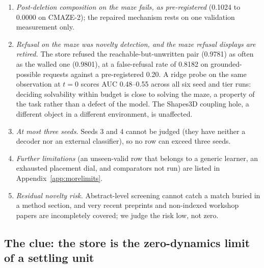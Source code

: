 \documentclass{article} %
\begin{document}
\begin{enumerate}[leftmargin=*,itemsep=1pt]
  the store, the pre-declared falsifier fired on row 3 (\S\ref{sec:bard}). %
\item \emph{Post-deletion composition on the maze fails, as pre-registered} (0.1024 to 0.0000
  on CMAZE-2); the repaired mechanism rests on one validation measurement only.
\item \emph{Refusal on the maze was novelty detection, and the maze refusal displays are
  retired.} The store refused the reachable-but-unwritten pair (0.9781) as often as the walled
  one (0.9801), at a false-refusal rate of 0.8182 on grounded-possible requests against a
  pre-registered 0.20. %
  A ridge probe on the same observation at $t=0$ scores AUC 0.48--0.55 across all six seed and
  tier runs: deciding solvability within budget is close to solving the maze, a property of the task rather than a defect of the model. %
  The Shapes3D coupling hole, a different object in a different environment, is unaffected.
\item \emph{At most three seeds.} Seeds 3 and 4 cannot be judged (they have neither a decoder
  nor an external classifier), so no row can exceed three seeds.
\item \emph{Further limitations} (an unseen-valid row that belongs to a generic learner, an
  exhausted placement dial, and comparators not run) are listed in Appendix~\ref{app:morelimits}.
\item \emph{Residual novelty risk.} Abstract-level screening cannot catch a match buried in a
  method section, and very recent preprints and non-indexed workshop papers are incompletely covered; we judge the risk low, not zero. %
\end{enumerate}

\subsection{The clue: the store is the zero-dynamics limit of a settling unit}
\label{sec:clue}
\end{document}

